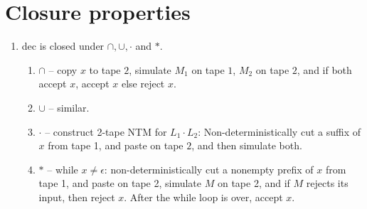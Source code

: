 \documentclass[a4paper]{article}
\begin{document}
\section{Closure properties}
\begin{enumerate}
    \item dec is closed under $\cap, \cup, \cdot$ and $*$.
        \begin{enumerate}
            \item $\cap$ -- copy $x$ to tape $2$, simulate $M_1$ on tape $1$, $M_2$ on tape $2$, and if both accept $x$, accept $x$ else reject $x$.
            \item $\cup$ -- similar.
            \item $\cdot$ -- construct 2-tape NTM for $L_1 \cdot L_2$: Non-deterministically cut a suffix of $x$ from tape 1, and paste on tape $2$, and then simulate both.
            \item $*$ -- while $x \ne \epsilon$: non-deterministically cut a nonempty prefix of $x$ from tape 1, and paste on tape 2, simulate $M$ on tape 2, and if $M$ rejects its input, then
                reject $x$. After the while loop is over, accept $x$.
        \end{enumerate}
\end{enumerate}
\end{document}
